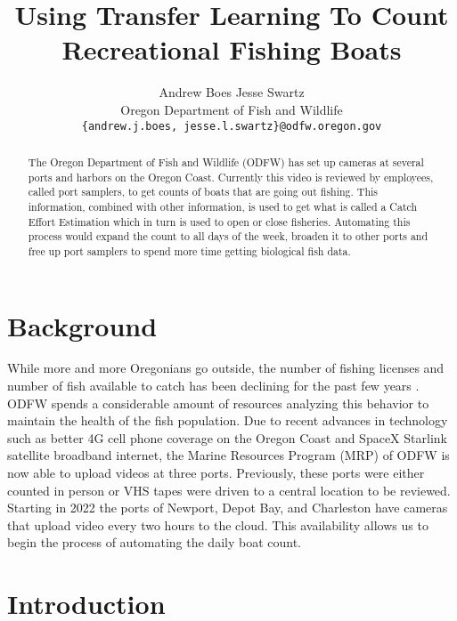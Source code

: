 \documentclass[10pt,twocolumn,letterpaper]{article}
\begin{document}
\title{ Using Transfer Learning To Count Recreational Fishing Boats }

\author{Andrew Boes \hspace{30pt} Jesse Swartz \\
Oregon Department of Fish and Wildlife\\
{\tt\small \{andrew.j.boes, jesse.l.swartz\}@odfw.oregon.gov}
}
\maketitle

\begin{abstract}
   The Oregon Department of Fish and Wildlife (ODFW) has set up cameras at several ports and harbors on the Oregon Coast. Currently this video is reviewed by employees, called port samplers, to get counts of boats that are going out fishing. This information, combined with other information, is used to get what is called a Catch Effort Estimation which in turn is used to open or close fisheries. Automating this process would expand the count to all days of the week, broaden it to other ports and free up port samplers to spend more time getting biological fish data.
\end{abstract}

\section{Background}

While more and more Oregonians go outside, the number of fishing licenses and number of fish available to catch has been declining for the past few years \cite{ODFW_Annual}. ODFW spends a considerable amount of resources analyzing this behavior to maintain the health of the fish population. Due to recent advances in technology such as better 4G cell phone coverage on the Oregon Coast and SpaceX Starlink satellite broadband internet, the Marine Resources Program (MRP) of ODFW is now able to upload videos at three ports. Previously, these ports were either counted in person or VHS tapes were driven to a central location to be reviewed. Starting in 2022 the ports of Newport, Depot Bay, and Charleston have cameras that upload video every two hours to the cloud. This availability allows us to begin the process of automating the daily boat count.\\[-5pt]

\section{Introduction}
\end{document}
